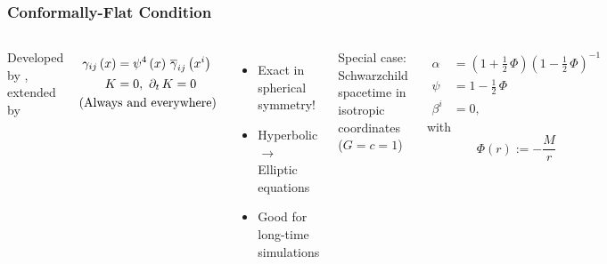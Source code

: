 \documentclass{beamer}
\begin{document}
\begin{frame}
\frametitle{Conformally-Flat Condition}

  \begin{columns}[c]


      Developed by \citet{wmm1996}, extended by \citet{cc2009}

      \begin{align*}
        \gamma_{ij}\left(x\right)
        &=\psi^{4}\left(x\right)\,\overline{\gamma}_{ij}\left(x^{i}\right) \\
        K&=0,\ \p_{t}\,K=0 \\
        &\hspace{-3em}\mathrm{(Always\ and\ everywhere)}
      \end{align*}\vspace{1em}

      \begin{itemize}
        \item Exact in spherical symmetry!
        \item Hyperbolic $\rightarrow$ Elliptic equations
        \item Good for long-time simulations
      \end{itemize}


      Special case: Schwarzchild spacetime in isotropic coordinates
      ($G=c=1$)

      \begin{align*}
        \alpha
          &=\left(1+\frac{1}{2}\,\Phi\right)
            \left(1-\frac{1}{2}\,\Phi\right)^{-1} \\
        \psi
          &=1-\frac{1}{2}\,\Phi \\
        \beta^{i}
          &=0,
      \end{align*}
      with
      \begin{equation*}
        \Phi\left(r\right):=-\frac{M}{r}
      \end{equation*}

  \end{columns}

\end{frame}
\end{document}
